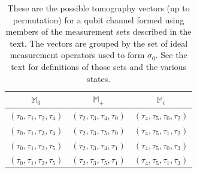\begin{table}[t]
\centering
\begin{tabular}{ccc}
\toprule
$\mathbb{M}_0$ & $\mathbb{M}_+$ & $\mathbb{M}_i$ \\
\midrule
$(\tau_0,\tau_1,\tau_2,\tau_4)$ & $(\tau_2,\tau_3,\tau_4,\tau_0)$ & $(\tau_4,\tau_5,\tau_0,\tau_2)$ \\
$(\tau_0,\tau_1,\tau_3,\tau_4)$ & $(\tau_2,\tau_3,\tau_5,\tau_0)$ & $(\tau_4,\tau_5,\tau_1,\tau_2)$ \\
$(\tau_0,\tau_1,\tau_2,\tau_5)$ & $(\tau_2,\tau_3,\tau_4,\tau_1)$ & $(\tau_4,\tau_5,\tau_0,\tau_3)$ \\
$(\tau_0,\tau_1,\tau_3,\tau_5)$ & $(\tau_2,\tau_3,\tau_5,\tau_1)$ & $(\tau_4,\tau_5,\tau_1,\tau_3)$ \\
\bottomrule
\end{tabular}
\caption{These are the possible tomography vectors (up to permutation) for a qubit channel formed using members of the measurement sets described in the text.  The vectors are grouped by the set of ideal measurement operators used to form $\sigma_0$.  See the text for definitions of those sets and the various states.}
\label{tab:tomosets}
\end{table}

